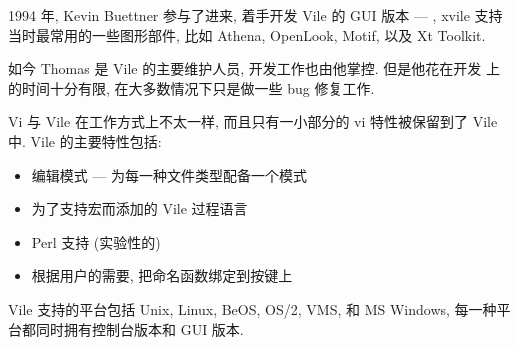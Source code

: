 1994 年, Kevin Buettner 参与了进来, 着手开发 Vile 的 GUI 版本 ---
, xvile 支持当时最常用的一些图形部件, 比如 Athena,
OpenLook, Motif, 以及 Xt Toolkit.

如今 Thomas 是 Vile 的主要维护人员, 开发工作也由他掌控. 但是他花在开发
上的时间十分有限, 在大多数情况下只是做一些 bug 修复工作.

Vi 与 Vile 在工作方式上不太一样, 而且只有一小部分的 vi 特性被保留到了
Vile 中. Vile 的主要特性包括:
\begin{itemize}
    \item 编辑模式 --- 为每一种文件类型配备一个模式
    \item 为了支持宏而添加的 Vile  过程语言
    \item Perl 支持 (实验性的)
    \item 根据用户的需要, 把命名函数绑定到按键上
\end{itemize}

Vile 支持的平台包括 Unix, Linux, BeOS, OS/2, VMS, 和 MS Windows,
每一种平台都同时拥有控制台版本和 GUI 版本.
